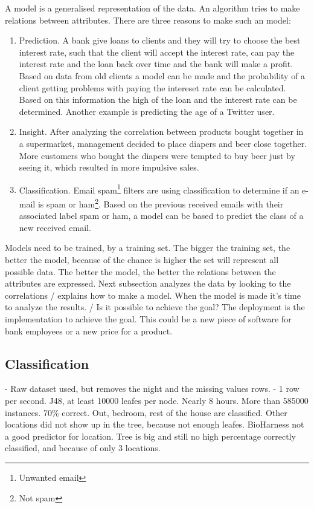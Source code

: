 	A model is a generalised representation of the data. An algorithm tries to make relations between attributes. There are three reasons to make such an model:
	\begin{enumerate}
		\item Prediction. A bank give loans to clients and they will try to choose the best interest rate, such that the client will accept the interest rate, can pay the interest rate and the loan back over time and the bank will make a profit. Based on data from old clients a model can be made and the probability of a client getting problems with paying the intereset rate can be calculated. Based on this information the high of the loan and the interest rate can be determined.\cite{credit} Another example is predicting the age of a Twitter user\cite{tweetgenie}.		
		\item Insight. After analyzing the correlation between products bought together in a supermarket, management decided to place diapers and beer close together. More customers who bought the diapers were tempted to buy beer just by seeing it, which resulted in more impulsive sales\cite{beer}.
		\item Classification. Email spam\footnote{Unwanted email} filters are using classification to determine if an e-mail is spam or ham\footnote{Not spam}. Based on the previous received emails with their associated label spam or ham, a model can be based to predict the class of a new received email. 
	\end{enumerate}
	Models need to be trained, by a training set. The bigger the training set, the better the model, because of the chance is higher the set will represent all possible data. The better the model, the better the relations between the attributes are expressed. Next subsection analyzes the data by looking to the correlations / explains how to make a model. When the model is made it's time to analyze the results. / Is it possible to achieve the goal? The deployment is the implementation to achieve the goal. This could be a new piece of software for bank employees or a new price for a product. 

	\subsection{Classification}
	- Raw dataset used, but removes the night and the missing values rows.
	- 1 row per second. J48, at least 10000 leafes per node. Nearly 8 hours. More than 585000 instances. 70\% correct. Out, bedroom, rest of the house are classified. Other locations did not show up in the tree, because not enough leafes. BioHarness not a good predictor for location. Tree is big and still no high percentage correctly classified, and because of only 3 locations. 

